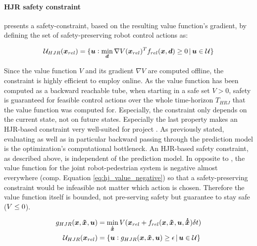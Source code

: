 \paragraph{\ac{HJR} safety constraint}
\cite{Leung2020} presents a safety-constraint, based on the resulting value function's gradient, by defining the set of safety-preserving robot control actions as:

\begin{equation}
\mathcal{U}_{HJR} (\boldsymbol{x}_{rel}) = \{ \boldsymbol{u}: \min_{\boldsymbol{d}} \nabla V (\boldsymbol{x}_{rel})^T f_{rel}(\boldsymbol{x}, \boldsymbol{d}) \geq 0 \, | \, \boldsymbol{u} \in \mathcal{U} \}
\end{equation}

Since the value function $V$ and its gradient $\nabla V$ are computed offline, the constraint is highly efficient to employ online. As the value function has been computed as a backward reachable tube, when starting in a safe set $V > 0$, safety is guaranteed for feasible control actions over the whole time-horizon $T_{HRJ}$ that the value function was computed for. Especially, the constraint only depends on the current state, not on future states. Especially the last property makes an \ac{HJR}-based constraint very well-suited for project \project. As previously stated, evaluating as well as in particular backward passing through the prediction model is the optimization's computational bottleneck. An \ac{HJR}-based safety constraint, as described above, is independent of the prediction model.
\newline
In opposite to \cite{Leung2020}, the value function for the joint robot-pedestrian system is negative almost everywhere (comp. Equation \ref{eq:hj_value_negative}) so that a safety-preserving constraint would be infeasible not matter which action is chosen. Therefore the value function itself is bounded, not pre-serving safety but guarantee to stay safe ($V \leq 0$).

\begin{align}
g_{HJR}(\x, \xped[], \u) &= \min_{\dxped[]} \Vrel(\xrel + \frel(\x, \xped[], \u, \dxped[]) \dt) \\
\uset_{HJR} (\xrel) &= \{ \u: g_{HJR}(\x, \xped[], \u) \geq \epsilon  \, | \, \u \in \uset \}
\label{eq:hj_constraint}
\end{align}


